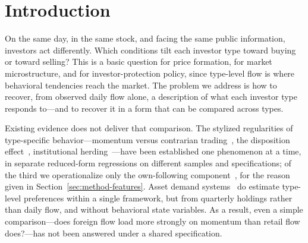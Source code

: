 \documentclass[sigconf,anonymous,review]{acmart}
\begin{document}


\maketitle

\section{Introduction}

On the same day, in the same stock, and facing the same public
information, investors act differently. Which conditions tilt each
investor type toward buying or toward selling? This is a basic question
for price formation, for market microstructure, and for
investor-protection policy, since type-level flow is where behavioral
tendencies reach the market. The problem we address is how to
recover, from observed daily flow alone, a description of what each
investor type responds to---and to recover it in a form that can be
compared across types.

Existing evidence does not deliver that comparison. The stylized
regularities of type-specific behavior---momentum versus contrarian
trading~\cite{grinblatt_keloharju2001}, the disposition
effect~\cite{shefrin_statman,odean1998}, institutional
herding~\cite{lakonishok_shleifer_vishny}---have been established one
phenomenon at a time, in separate reduced-form regressions on different
samples and specifications; of the third we operationalize only the
own-following component~\cite{sias2004}, for the reason given in
Section~\ref{sec:method-features}. Asset demand systems~\cite{koijen_yogo2019}
do estimate type-level preferences within a single framework, but from
quarterly holdings rather than daily flow, and without behavioral state
variables. As a result, even a simple comparison---does foreign flow load
more strongly on momentum than retail flow does?---has not been answered
under a shared specification.
\end{document}
